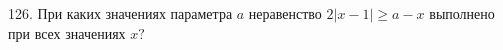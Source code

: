 126. При каких значениях параметра $a$ неравенство $2|x-1|\geqslant a-x$ выполнено при всех значениях $x?$\\
